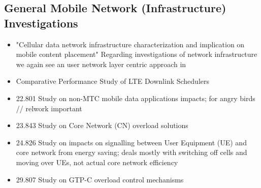 \subsection{General Mobile Network (Infrastructure) Investigations}
\begin{itemize}
	\item "Cellular data network infrastructure characterization and implication on mobile content placement" \cite{Xu:2011:CDN:2007116.2007149} Regarding investigations of network infrastructure we again see an user network layer centric approach in 
	\item Comparative Performance Study of LTE Downlink Schedulers \cite{biernacki2013ltescheduler}
	
	\item 22.801 \cite{3gpp.22.801} Study on non-MTC mobile data applications impacts; for angry birds // relwork important
	\item 23.843 \cite{3gpp.23.843} Study on Core Network (CN) overload solutions
	\item 24.826 \cite{3gpp.24.826} Study on impacts on signalling between User Equipment (UE) and core network from energy saving; deals mostly with switching off cells and moving over UEs, not actual core network efficiency
	\item 29.807 \cite{3gpp.29.807} Study on GTP-C overload control mechanisms

\end{itemize}




